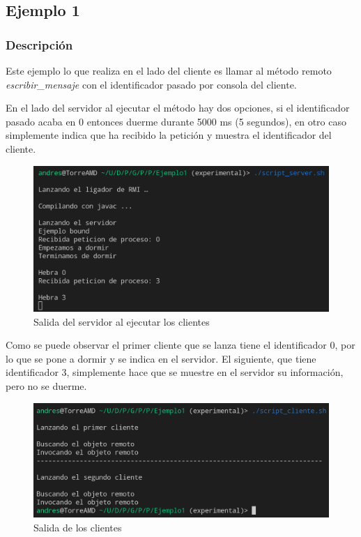 \documentclass{article}
\begin{document}
\subsection{Ejemplo 1}
\subsubsection{Descripción}
Este ejemplo lo que realiza en el lado del cliente es llamar al método remoto \textit{escribir\_mensaje} con el identificador pasado por consola del cliente.

En el lado del servidor al ejecutar el método hay dos opciones, si el identificador pasado acaba en 0 entonces duerme durante 5000 ms (5 segundos), en otro caso simplemente indica que ha recibido la petición y muestra el identificador del cliente.

\begin{figure}[H]
    \includegraphics[width=\textwidth]{imagenes/E1S.png}
    \caption{Salida del servidor al ejecutar los clientes}
\end{figure}

Como se puede observar el primer cliente que se lanza tiene el identificador 0, por lo que se pone a dormir y se indica en el servidor. El siguiente, que tiene identificador 3, simplemente hace que se muestre en el servidor su información, pero no se duerme.

\begin{figure}[H]
    \includegraphics[width=\textwidth]{imagenes/E1C.png}
    \caption{Salida de los clientes}
\end{figure}
\end{document}
